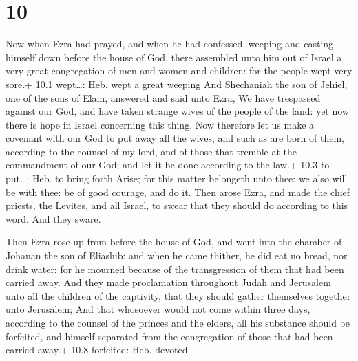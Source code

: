 \hypertarget{section-9}{%
\section{10}\label{section-9}}

 Now when Ezra had prayed, and when he had confessed,
weeping and casting himself down before the house of God, there
assembled unto him out of Israel a very great congregation of men and
women and children: for the people wept very sore.+ 10.1 wept\ldots:
Heb. wept a great weeping  And Shechaniah the son of Jehiel,
one of the sons of Elam, answered and said unto Ezra, We have trespassed
against our God, and have taken strange wives of the people of the land:
yet now there is hope in Israel concerning this thing.  Now
therefore let us make a covenant with our God to put away all the wives,
and such as are born of them, according to the counsel of my lord, and
of those that tremble at the commandment of our God; and let it be done
according to the law.+ 10.3 to put\ldots: Heb. to bring forth
 Arise; for this matter belongeth unto thee: we also will be
with thee: be of good courage, and do it.  Then arose Ezra,
and made the chief priests, the Levites, and all Israel, to swear that
they should do according to this word. And they sware.

 Then Ezra rose up from before the house of God, and went
into the chamber of Johanan the son of Eliashib: and when he came
thither, he did eat no bread, nor drink water: for he mourned because of
the transgression of them that had been carried away.  And
they made proclamation throughout Judah and Jerusalem unto all the
children of the captivity, that they should gather themselves together
unto Jerusalem;  And that whosoever would not come within
three days, according to the counsel of the princes and the elders, all
his substance should be forfeited, and himself separated from the
congregation of those that had been carried away.+ 10.8 forfeited: Heb.
devoted

